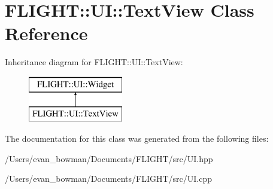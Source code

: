 \hypertarget{class_f_l_i_g_h_t_1_1_u_i_1_1_text_view}{}\section{F\+L\+I\+G\+HT\+:\+:UI\+:\+:Text\+View Class Reference}
\label{class_f_l_i_g_h_t_1_1_u_i_1_1_text_view}
Inheritance diagram for F\+L\+I\+G\+HT\+:\+:UI\+:\+:Text\+View\+:\begin{figure}[H]
\begin{center}
\leavevmode
\includegraphics[height=2.000000cm]{class_f_l_i_g_h_t_1_1_u_i_1_1_text_view}
\end{center}
\end{figure}


The documentation for this class was generated from the following files\+:\begin{DoxyCompactItemize}
\item 
/\+Users/evan\+\_\+bowman/\+Documents/\+F\+L\+I\+G\+H\+T/src/U\+I.\+hpp\item 
/\+Users/evan\+\_\+bowman/\+Documents/\+F\+L\+I\+G\+H\+T/src/U\+I.\+cpp\end{DoxyCompactItemize}
